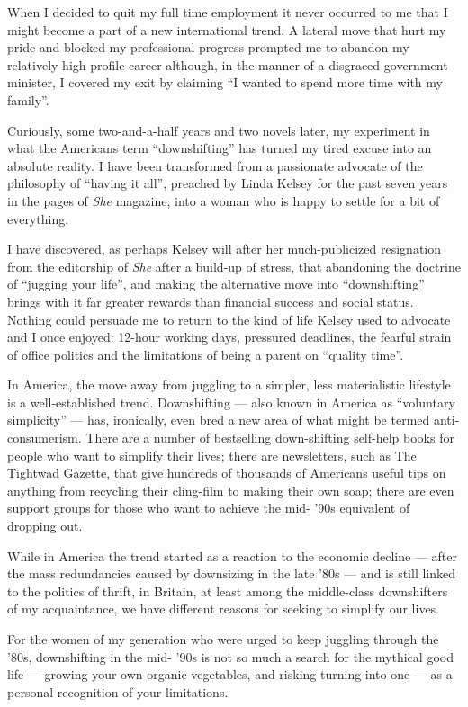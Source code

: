 \documentclass[UTF8,11pt]{ctexart}
\begin{document}
When I decided to quit my full time employment it never occurred to me that I might become a part of a new international trend. A lateral move that hurt my pride and blocked my professional progress prompted me to abandon my relatively high profile career although, in the manner of a disgraced government minister, I covered my exit by claiming “I wanted to spend more time with my family”.


Curiously, some two-and-a-half years and two novels later, my experiment in what the Americans term “downshifting” has turned my tired excuse into an absolute reality. I have been transformed from a passionate advocate of the philosophy of “having it all”, preached by Linda Kelsey for the past seven years in the pages of \textit{She} magazine, into a woman who is happy to settle for a bit of everything.


I have discovered, as perhaps Kelsey will after her much-publicized resignation from the editorship of \textit{She} after a build-up of stress, that abandoning the doctrine of “jugging your life”, and making the alternative move into “downshifting” brings with it far greater rewards than financial success and social status. Nothing could persuade me to return to the kind of life Kelsey used to advocate and I once enjoyed: 12-hour working days, pressured deadlines, the fearful strain of office politics and the limitations of being a parent on “quality time”.


In America, the move away from juggling to a simpler, less materialistic lifestyle is a well-established trend. Downshifting — also known in America as “voluntary simplicity” — has, ironically, even bred a new area of what might be termed anti-consumerism. There are a number of bestselling down-shifting self-help books for people who want to simplify their lives; there are newsletters, such as The Tightwad Gazette, that give hundreds of thousands of Americans useful tips on anything from recycling their cling-film to making their own soap; there are even support groups for those who want to achieve the mid- ’90s equivalent of dropping out.


While in America the trend started as a reaction to the economic decline — after the mass redundancies caused by downsizing in the late ’80s — and is still linked to the politics of thrift, in Britain, at least among the middle-class downshifters of my acquaintance, we have different reasons for seeking to simplify our lives.


For the women of my generation who were urged to keep juggling through the ’80s, downshifting in the mid- ’90s is not so much a search for the mythical good life — growing your own organic vegetables, and risking turning into one — as a personal recognition of your limitations.
\end{document}
